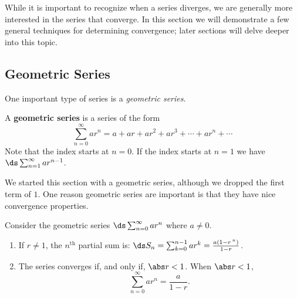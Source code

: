 While it is important to recognize when a series diverges, we are generally more interested in the series that  converge. In this section we will demonstrate a few general techniques for determining convergence; later sections will delve deeper into this topic.

\subsection{Geometric Series}

One important type of series is a \emph{geometric series}.

\begin{definition}\label{def:geom_series}
A \textbf{geometric series} is a series of the form 
\[\sum_{n=0}^\infty ar^n = a+ar+ar^2+ar^3+\dotsb+ar^n+\dotsb\]
Note that the index starts at $n=0$. If the index starts at $n=1$ we have $\ds \sum_{n=1}^\infty ar^{n-1}$.%
\end{definition}

We started this section with a geometric series, although we dropped the first term of $1$. One reason geometric series are important is that they have nice convergence properties.

\begin{theorem}\label{thm:geom_series}
Consider the geometric series $\ds \sum_{n=0}^\infty ar^n$ where $a\neq0$.\vspace{-.5\baselineskip}
\begin{enumerate}
\item	If $r\neq1$, the $n^\text{th}$ partial sum is: $\ds S_n = \sum_{k=0}^{n-1}ar^k=\frac{a(1-r\,^n)}{1-r}$.
\item	The series converges if, and only if, $\abs r<1$. When $\abs r<1$, 
\[\sum_{n=0}^\infty ar^n = \frac{a}{1-r}.\]
\end{enumerate}
\end{theorem}

